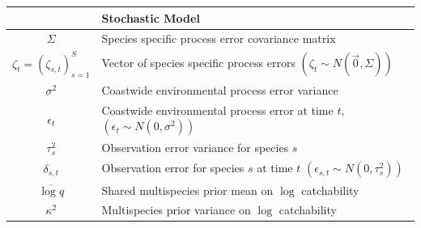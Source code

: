 \documentclass[]{scrartcl}
\begin{document}
\begin{table}[htbp]
\begin{center}
\begin{tabular}{c|l}
\hline
& \textbf{ Stochastic Model} \\
\hline
$\Sigma$ & Species specific process error covariance matrix  \\
$\zeta_t = \left(\zeta_{s,t}\right)_{s=1}^S$ & Vector of species specific process errors $\left(\zeta_t \sim N ( \vec{0}, \Sigma)\right)$  \\
$\sigma^2$ & Coastwide environmental process error variance \\
$\epsilon_{t}$ & Coastwide environmental process error at time $t$, $\left( \epsilon_{t} \sim N (0, \sigma^2) \right)$ \\
$\tau_s^2$ & Observation error variance for species $s$ \\
$\delta_{s,t}$ & Observation error for species $s$ at time $t$ $\left(\epsilon_{s,t} \sim N (0, \tau_s^2) \right)$ \\
$\overline{\log q}$ & Shared multispecies prior mean on $\log$ catchability \\
$\kappa^2$ & Multispecies prior variance on $\log$ catchability \\
\hline
\end{tabular}
\end{center}
\end{table}

\newpage
\end{document}
